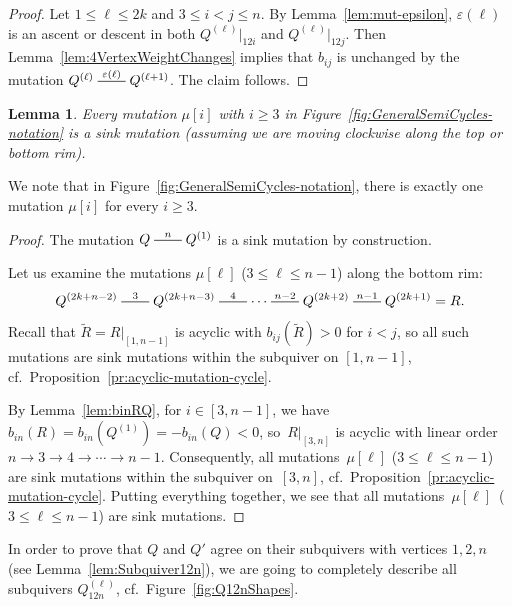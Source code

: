 \documentclass[11pt, letterpaper]{amsart}
\newtheorem{lemma}[theorem]{Lemma}
\theoremstyle{definition}
\numberwithin{equation}{section}
\newcommand{\mutation}[1]{\stackrel{#1}{\rule[.5ex]{2em}{0.5pt}}}
\begin{document}
\begin{proof}%
Let $1\le \ell\le 2k$ and $3\le i<j\le n$. 
By Lemma~\ref{lem:mut-epsilon},
$\varepsilon(\ell)$ is an ascent or descent in both $Q^{(\ell)}|_{12i}$ and $Q^{(\ell)}|_{12j}$.
Then Lemma~\ref{lem:4VertexWeightChanges} implies that $b_{ij}$ is unchanged by the 
mutation $Q^{(\ell)}\mutation{\varepsilon(\ell)}Q^{(\ell+1)}$. 
The claim follows. 
\end{proof}

\label{Sec:Sinks}

\begin{lemma}
\label{lem:Sinks}
Every mutation $\mu[i]$ with $i\ge 3$ in Figure~\ref{fig:GeneralSemiCycles-notation}
is a sink mutation (assuming we are moving clockwise  along the top or bottom rim). 
\end{lemma}

We note that in Figure~\ref{fig:GeneralSemiCycles-notation},
there is exactly one mutation $\mu[i]$ for every $i\ge 3$. 

\begin{proof}%
The mutation $Q\mutation{n}Q^{(1)}$ is a sink mutation by construction. 

Let us examine the mutations $\mu[\ell]$ ($3\le \ell \le n-1$) along the bottom rim:
\begin{equation}
\label{eq:bottom(n-2)}
Q^{(2k+n-2)} \mutation{3} Q^{(2k+n-3)} \mutation{4} \cdots \mutation{n-2}
         Q^{(2k+2)} \mutation{n-1} Q^{(2k+1)} =R. 
\end{equation}
Recall that $\tilde R=R|_{[1,n-1]}$ is acyclic with $b_{ij}(\tilde R)>0$ for $i<j$,
so all such mutations are sink mutations 
within the subquiver on $[1,n-1]$, cf.\ Proposition~\ref{pr:acyclic-mutation-cycle}. 

By Lemma~\ref{lem:binRQ}, for $i \in [3,n-1]$, we have~$b_{in}(R) = b_{in}(Q^{(1)}) = - b_{in}(Q) < 0$,
so~$R|_{[3,n]}$ is acyclic with linear order~$n\to 3\to 4\to\cdots\to n-1$. 
Consequently, all mutations~$\mu[\ell]$ ($3\le \ell \le n-1$) are sink mutations 
within the subquiver on~$[3,n]$, cf.~Proposition~\ref{pr:acyclic-mutation-cycle}. 
%
Putting everything together, we see that all mutations~$\mu[\ell]$~(${3\le \ell \le n-1}$) are sink mutations. 
\end{proof}

In order to prove that $Q$ and $Q'$ agree on their subquivers with vertices $1,2,n$
(see Lemma~\ref{lem:Subquiver12n}), we are going to completely describe all subquivers $Q^{(\ell)}_{12n}$, cf.\ Figure~\ref{fig:Q12nShapes}. 
\end{document}
